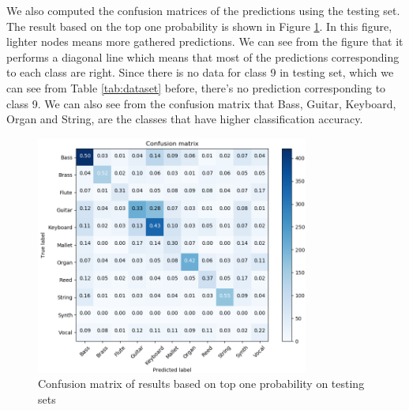 \documentclass{article}
\begin{document}
We also computed the confusion matrices of the predictions using the testing set. The result based on the top one probability is shown in Figure \ref{fig:confusionmatrix}. In this figure, lighter nodes means more gathered predictions. We can see from the figure that it performs a diagonal line which means that most of the predictions corresponding to each class are right. Since there is no data for class 9 in testing set, which we can see from Table \ref{tab:dataset} before, there's no prediction corresponding to class 9. We can also see from the confusion matrix that Bass, Guitar, Keyboard, Organ and String, are the classes that have higher classification accuracy.


\begin{figure}[h!]
\centering
\includegraphics[width=0.8\textwidth]{confusion_top1.png}
\caption{Confusion matrix of results based on top one probability on testing sets}
\label{fig:confusionmatrix}
\end{figure}



\end{document}
